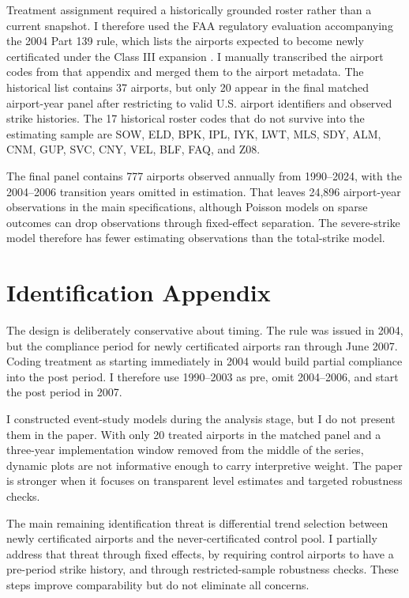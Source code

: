 \documentclass[12pt]{article}
\begin{document}
Treatment assignment required a historically grounded roster rather than a current snapshot. I therefore used the FAA regulatory evaluation accompanying the 2004 Part 139 rule, which lists the airports expected to become newly certificated under the Class III expansion \citep{faa_reg_eval_2004}. I manually transcribed the airport codes from that appendix and merged them to the airport metadata. The historical list contains 37 airports, but only 20 appear in the final matched airport-year panel after restricting to valid U.S. airport identifiers and observed strike histories. The 17 historical roster codes that do not survive into the estimating sample are SOW, ELD, BPK, IPL, IYK, LWT, MLS, SDY, ALM, CNM, GUP, SVC, CNY, VEL, BLF, FAQ, and Z08.

The final panel contains 777 airports observed annually from 1990--2024, with the 2004--2006 transition years omitted in estimation. That leaves 24,896 airport-year observations in the main specifications, although Poisson models on sparse outcomes can drop observations through fixed-effect separation. The severe-strike model therefore has fewer estimating observations than the total-strike model.

\section{Identification Appendix}

The design is deliberately conservative about timing. The rule was issued in 2004, but the compliance period for newly certificated airports ran through June 2007. Coding treatment as starting immediately in 2004 would build partial compliance into the post period. I therefore use 1990--2003 as pre, omit 2004--2006, and start the post period in 2007.

I constructed event-study models during the analysis stage, but I do not present them in the paper. With only 20 treated airports in the matched panel and a three-year implementation window removed from the middle of the series, dynamic plots are not informative enough to carry interpretive weight. The paper is stronger when it focuses on transparent level estimates and targeted robustness checks.

The main remaining identification threat is differential trend selection between newly certificated airports and the never-certificated control pool. I partially address that threat through fixed effects, by requiring control airports to have a pre-period strike history, and through restricted-sample robustness checks. These steps improve comparability but do not eliminate all concerns.
\end{document}

